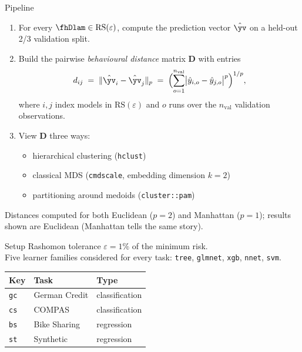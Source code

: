 \documentclass[aspectratio=169]{beamer}
\newcommand{\Rset}{\mathrm{RS}(\varepsilon)}
\begin{document}
\begin{frame}{Pipeline}
  \begin{enumerate}
    \item For every $\fhDlam \in \Rset$, compute the prediction vector $\hat{\yv}$ on a held-out 2/3 validation split.
    \item Build the pairwise \emph{behavioural distance} matrix $\mathbf{D}$ with entries
      \[
        d_{ij} \;=\; \|\hat{\yv}_i - \hat{\yv}_j\|_p \;=\; \Bigl(\sum_{o=1}^{n_{\text{val}}} \bigl|\hat y_{i,o} - \hat y_{j,o}\bigr|^p\Bigr)^{1/p},
      \]
      where $i, j$ index models in $\Rset$ and $o$ runs over the $n_{\text{val}}$ validation observations.
    \item View $\mathbf{D}$ three ways:
      \begin{itemize}
        \item hierarchical clustering (\texttt{hclust})
        \item classical MDS (\texttt{cmdscale}, embedding dimension $k = 2$)
        \item partitioning around medoids (\texttt{cluster::pam})
      \end{itemize}
  \end{enumerate}
  \vspace{0.5ex}
  {\footnotesize Distances computed for both Euclidean ($p = 2$) and Manhattan ($p = 1$); results shown are Euclidean (Manhattan tells the same story).}
\end{frame}

\begin{frame}{Setup}
  Rashomon tolerance $\varepsilon = 1\%$ of the minimum risk.\\
  Five learner families considered for every task: \texttt{tree}, \texttt{glmnet}, \texttt{xgb}, \texttt{nnet}, \texttt{svm}.
  \vspace{2ex}
  \begin{table}[h]
    \centering
    \begin{tabular}{lll}
      \toprule
      Key & Task & Type \\
      \midrule
      \texttt{gc} & German Credit  & classification \\
      \texttt{cs} & COMPAS         & classification \\
      \texttt{bs} & Bike Sharing   & regression     \\
      \texttt{st} & Synthetic      & regression     \\
      \bottomrule
    \end{tabular}
  \end{table}
\end{frame}
\end{document}
